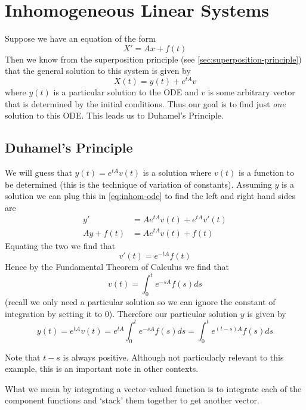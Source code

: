 
\section{Inhomogeneous Linear Systems}
Suppose we have an equation of the form
\begin{equation}\label{eq:inhom-ode}
    X' = Ax + f(t)
\end{equation}
Then we know from the superposition principle (see \autoref{sec:superposition-principle}) that the general solution to this system is given by
$$ X(t) = y(t) + e^{tA}v $$
where $y(t)$ is a particular solution to the ODE and $v$ is some arbitrary vector that is determined by the initial conditions. Thus our goal is to find just \textit{one} solution to this ODE. This leads us to Duhamel's Principle.

\subsection{Duhamel's Principle}
We will guess that $y(t) = e^{tA} v(t)$ is a solution where $v(t)$ is a function to be determined (this is the technique of variation of constants). Assuming $y$ is a solution we can plug this in \autoref{eq:inhom-ode} to find the left and right hand sides are
\begin{align}
    y' &= Ae^{tA} v(t) + e^{tA} v'(t) \tag{LHS}\\
    Ay + f(t) &= Ae^{tA} v(t) + f(t) \tag{RHS}
\end{align}
Equating the two we find that
$$ v'(t) = e^{-tA} f(t) $$
Hence by the Fundamental Theorem of Calculus we find that 
$$ v(t) = \int_{0}^{t} e^{-sA} f(s) ds $$
(recall we only need a particular solution so we can ignore the constant of integration by setting it to 0). 
Therefore our particular solution $y$ is given by
$$ y(t) = e^{tA} v(t) = e^{tA} \int_{0}^t e^{-sA} f(s) ds = \int_{0}^t e^{(t - s)A} f(s) ds $$
\begin{remark}
Note that $t - s$ is always positive. Although not particularly relevant to this example, this is an important note in other contexts.
\end{remark}
\begin{remark}
What we mean by integrating a vector-valued function is to integrate each of the component functions and `stack' them together to get another vector.
\end{remark}

